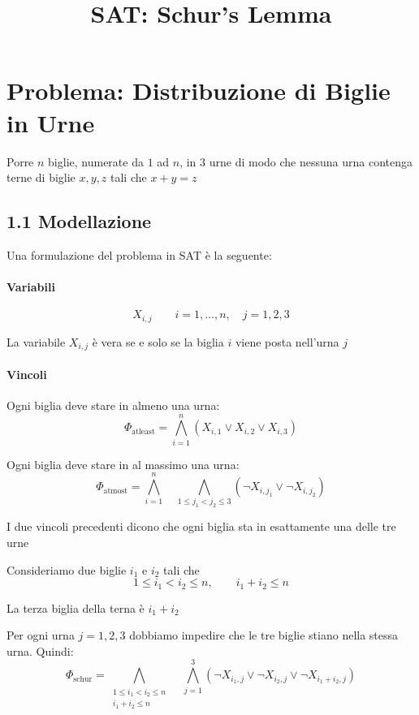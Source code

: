 \documentclass[a4paper,11pt]{article}
\title{SAT: Schur's Lemma}
\date{}
\begin{document}
\maketitle

\section*{Problema: Distribuzione di Biglie in Urne}
Porre $n$ biglie, numerate da $1$ ad $n$, in $3$ urne di modo che nessuna urna contenga terne di biglie $x, y, z$ tali che $x + y = z$


\subsection*{1.1 Modellazione} 
Una formulazione del problema in SAT è la seguente:

\paragraph{Variabili}

\[
X_{i,j}
\qquad
 i=1,\dots,n,
\quad
 j=1,2,3
\]

La variabile $X_{i,j}$ è vera se e solo se la biglia $i$ viene posta nell'urna $j$

\paragraph{Vincoli}

Ogni biglia deve stare in almeno una urna:
\[
\Phi_{\mathrm{atleast}}
=
\bigwedge_{i=1}^{n}
(
X_{i,1}\lor X_{i,2}\lor X_{i,3}
)
\]


Ogni biglia deve stare in al massimo una urna:
\[
\Phi_{\mathrm{atmost}}
=
\bigwedge_{i=1}^{n}
\quad
\bigwedge_{1\leq j_1<j_2\leq 3}
(
\lnot X_{i,j_1}\lor \lnot X_{i,j_2}
)
\]

I due vincoli precedenti dicono che ogni biglia sta in esattamente una delle tre urne

Consideriamo due biglie $i_1$ e $i_2$ tali che
\[
1\leq i_1<i_2\leq n,
\qquad
 i_1+i_2\leq n
\]

La terza biglia della terna è $i_1+i_2$

Per ogni urna $j=1,2,3$ dobbiamo impedire che le tre biglie stiano nella stessa urna. Quindi:
\[
\Phi_{\mathrm{schur}}
=
\bigwedge_{\substack{
1\leq i_1<i_2\leq n\\
i_1+i_2\leq n
}}
\quad
\bigwedge_{j=1}^{3}
(
\lnot X_{i_1,j}
\lor
\lnot X_{i_2,j}
\lor
\lnot X_{i_1+i_2,j}
)
\]
\end{document}
